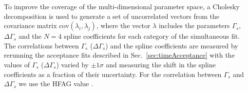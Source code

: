 To improve the coverage of the multi-dimensional parameter space, a Cholesky decomposition \cite{Golub:1996:MC:248979} is used to generate a set of uncorrelated vectors from the covariance matrix $\text{cov}(\lambda_i,\lambda_j)$, where the vector $\lambda$ includes the parameters $\Gamma_s$, $\Delta\Gamma_s$ and the $N=4$ spline coefficients for each category of the simultaneous fit.
The correlations between $\Gamma_s$ ($\Delta\Gamma_s$) and the spline coefficients are measured by rerunning the acceptance fits described in Sec.~\ref{sec:timeAcceptance} 
with the values of $\Gamma_s$ ($\Delta\Gamma_s$) varied by $\pm 1\sigma$ and measuring the shift in the spline coefficients as a fraction of
their uncertainty. 
For the correlation between $\Gamma_s$ and $\Delta\Gamma_s$ we use the HFAG value \cite{HFAG}.

%
